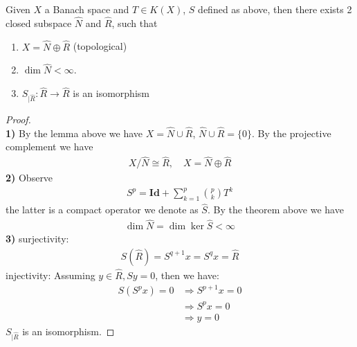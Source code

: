 \begin{corollary}
	Given $X$ a Banach space and $T \in K(X)$, $S$ defined as above, then there exists 2 closed subspace $\hat{N}$ and $\hat{R}$, such that
	\begin{enumerate}
		\item $X = \hat{N} \oplus \hat{R}$ (topological)
		\item $\dim \hat{N} < \infty$.
		\item $S_{|\hat{R}}: \hat{R} \rightarrow \hat{R}$ is an isomorphism
	\end{enumerate}
\end{corollary}
\begin{proof}
\quad \\\textbf{1)}
	By the lemma above we have $X = \hat{N} \cup \hat{R}$, $\hat{N} \cup \hat{R} = \{0\}$. By the projective complement we have
	\begin{align*}
		X\slash \hat{N} \cong \hat{R}, \quad X = \hat{N} \oplus \hat{R}
	\end{align*}
\textbf{2)}
Observe
\begin{align*}
	S^p = \textbf{Id} + \sum_{k = 1}^p \binom{p}{k} T^k
\end{align*}
the latter is a compact operator we denote as $\hat{S}$. By the theorem above we have
\begin{align*}
	\dim \hat{N} = \dim \ker \hat{S} < \infty
\end{align*}
\textbf{3)} surjectivity: 
\begin{align*}
	S(\hat{R}) = S^{q+1}x = S^{q}x = \hat{R}  
\end{align*}
injectivity: Assuming $y \in \hat{R}, Sy = 0$, then we have:
\begin{align*}
	S(S^px) = 0 &\Rightarrow S^{p+1}x = 0 \\
	&\Rightarrow S^p x = 0\\
	&\Rightarrow y = 0
\end{align*}
$S_{|\hat{R}}$ is an isomorphism.
\end{proof}


